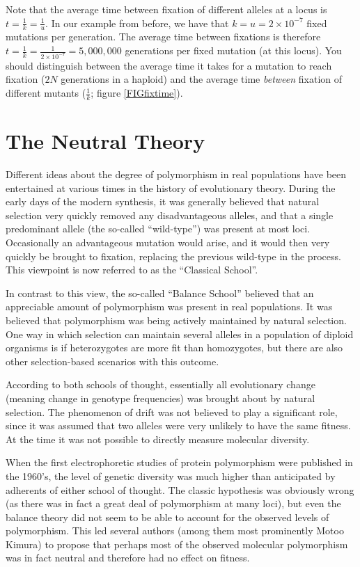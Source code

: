 \documentclass[11pt,a4paper]{book}
\newcommand{\e}{\emph}
\begin{document}
Note that the average time between fixation of different alleles at a locus is $t=\frac{1}{k}=\frac{1}{u}$. In our example from before, we have that $k=u={2\times 10^{-7}}$ fixed mutations per generation. The average time between fixations is therefore $t=\frac{1}{k}=\frac{1}{2\times 10^{-7}}=5,000,000$ generations per fixed mutation (at this locus). You should distinguish between the average time it takes for a mutation to reach fixation ($2N$ generations in a haploid) and the average time \e{between} fixation of different mutants ($\frac{1}{k}$; figure \ref{FIGfixtime}). 

\section{The Neutral Theory \label{SECneutheory}} 

Different ideas about the degree of polymorphism in real populations have been entertained at various times in the history of evolutionary theory. During the early days of the modern synthesis, it was generally believed that natural selection very quickly removed any disadvantageous alleles, and that a single predominant allele (the so-called ``wild-type'') was present at most loci. Occasionally an advantageous mutation would arise, and it would then very quickly be brought to fixation, replacing the previous wild-type in the process. This viewpoint is now referred to as the ``Classical School''.

In contrast to this view, the so-called ``Balance School'' believed that an appreciable amount of polymorphism was present in real populations. It was believed that polymorphism was being actively maintained by natural selection. One way in which selection can maintain several alleles in a population of diploid organisms is if heterozygotes are more fit than homozygotes, but there are also other selection-based scenarios with this outcome. 

According to both schools of thought, essentially all evolutionary change (meaning change in genotype frequencies) was brought about by natural selection. The phenomenon of drift was not believed to play a significant  role, since it was assumed that two alleles were very unlikely to have the same fitness. At the time it was not possible to directly measure molecular diversity. 

When the first electrophoretic studies of protein polymorphism  were published in the 1960's, the level of  genetic diversity was  much higher than anticipated by adherents of either school of thought. The classic hypothesis was obviously wrong (as there was in fact a great deal of polymorphism at many loci), but even the balance theory did not seem to be able to account for the observed levels of polymorphism. This led several authors (among them most prominently Motoo Kimura) to propose that perhaps most of the observed molecular polymorphism was in fact neutral and therefore had no effect on fitness. 
\end{document}
